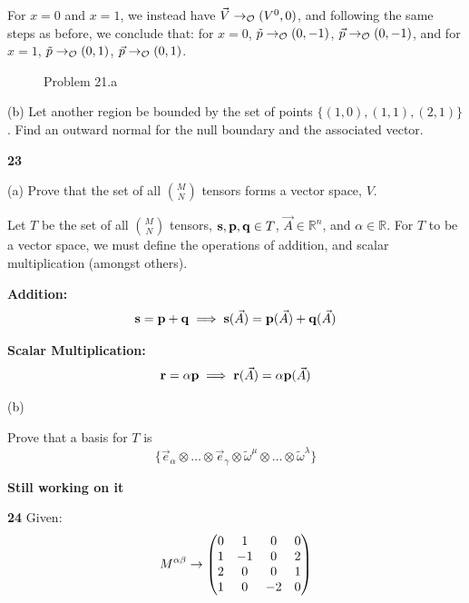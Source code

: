 \documentclass[gr-notes.tex]{subfiles}
\begin{document}
For $x = 0$ and $x = 1$, we instead have $\vec{V} \to_{\mathcal{O}} (V^0, 0)$, and following the same steps as before, we conclude that: for $x = 0$, $\tilde{p} \to_{\mathcal{O}} (0, -1)$, $\vec{p} \to_{\mathcal{O}} (0, -1)$, and for $x = 1$, $\tilde{p} \to_{\mathcal{O}} (0, 1)$, $\vec{p} \to_{\mathcal{O}} (0, 1)$.

\begin{figure}[h]
  \centering
  
  \caption{Problem 21.a}
  \label{fig:ch3-problem-21a}
\end{figure}

(b)
Let another region be bounded by the set of points $\{ (1,0),(1,1),(2,1) \}$. Find an outward normal for the null boundary and the associated vector.




\textbf{23}

(a)
Prove that the set of all $\binom{M}{N}$ tensors forms a vector space, $V$.

Let $T$ be the set of all $\binom{M}{N}$ tensors, $\vb{s}, \vb{p}, \vb{q} \in T$, $\vec{A} \in \mathbb{R}^n$, and $\alpha \in \mathbb{R}$. For $T$ to be a vector space, we must define the operations of addition, and scalar multiplication (amongst others).

\textbf{Addition:}
\begin{displaymath}
  \vb{s} = \vb{p} + \vb{q} \implies
  \vb{s}(\vec{A}) = \vb{p}(\vec{A}) + \vb{q}(\vec{A})
\end{displaymath}

\textbf{Scalar Multiplication:}
\begin{displaymath}
  \vb{r} = \alpha \vb{p} \implies
  \vb{r}(\vec{A}) = \alpha \vb{p}(\vec{A})
\end{displaymath}


(b)

Prove that a basis for $T$ is
\begin{displaymath}
  \{ \vec{e}_\alpha \otimes \ldots \otimes \vec{e}_\gamma
     \otimes
     \tilde{\omega}^\mu \otimes \ldots \otimes \tilde{\omega}^\lambda \}
\end{displaymath}

\textbf{Still working on it}


\textbf{24}
Given:
\begin{displaymath}
  M^{\alpha\beta} \to
  \mqty(
     0 &  1 &  0 &  0 \\
     1 & -1 &  0 &  2 \\
     2 &  0 &  0 &  1 \\
     1 &  0 & -2 &  0
  )
\end{displaymath}
\end{document}
